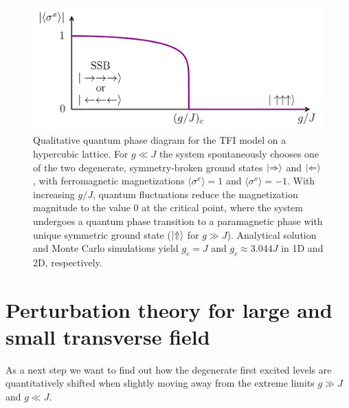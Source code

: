 \begin{figure}[h]
  \centering
  \includegraphics[width=0.7\linewidth]{tfi_phase_diagram.png}
  \caption{Qualitative quantum phase diagram for the TFI model on a hypercubic lattice. For $g \ll J$ the system spontaneously chooses one of the two degenerate, symmetry-broken ground states $\ket{\Rightarrow}$ and $\ket{\Leftarrow}$, with ferromagnetic magnetizations $\langle \sigma^x \rangle= 1$ and $\langle \sigma^x \rangle = -1$. With increasing $g/J$, quantum fluctuations reduce the magnetization magnitude to the value $0$ at the critical point, where the system undergoes a quantum phase transition to a paramagnetic phase with unique symmetric ground state ($\ket{\Uparrow}$ for $g \gg J$). Analytical solution and Monte Carlo simulations yield $g_c = J$ and $g_c \approx 3.044J$ in 1D and 2D, respectively.}
\label{fig:tfi_phase_diagram}
\end{figure}


\section{Perturbation theory for large and small transverse field} \label{sec:tfi_perturbation_theory}

As a next step we want to find out how the degenerate first excited levels are quantitatively shifted when slightly moving away from the extreme limits $g \gg J$ and $g \ll J$. \\

